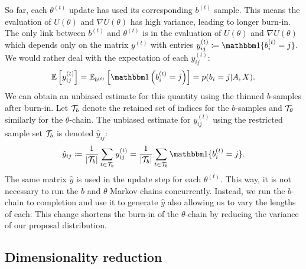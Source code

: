 So far, each $\theta^{(t)}$ update has used its corresponding $b^{(t)}$ sample. This means the evaluation of $U(\theta)$ and $\nabla U(\theta)$ has high variance, leading to longer burn-in. The only link between $b^{(t)}$ and $\theta^{(t)}$ is in the evaluation of $U(\theta)$ and $\nabla U(\theta)$ which depends only on the matrix $y^{(t)}$ with entries $y_{ij}^{(t)} \coloneqq \one\{b_i^{(t)} = j\}$. We would rather deal with the expectation of each $y_{ij}^{(t)}$:
%
\begin{equation}
	\Expect \left[ y_{ij}^{(t)} \right] = \Expect_{b^{(t)}} \left[ \one \left( b_{i}^{(t)} = j \right) \right]
	= p(b_i = j | A, X).
\end{equation}
%
We can obtain an unbiased estimate for this quantity using 
the thinned $b$-samples after burn-in.
Let $\mathcal{T}_b$  denote the retained set of indices 
for the $b$-samples and $\mathcal{T}_\theta$ similarly for the $\theta$-chain. 
The unbiased estimate for $y_{ij}^{(t)}$ using the 
restricted sample set $\mathcal{T}_b$ is denoted $\hat{y}_{ij}$:
%
\begin{equation}
	\hat{y}_{ij} \coloneqq \frac{1}{|\Tcal_b|} \sum_{t \in \Tcal_b} y_{ij}^{(t)} = \frac{1}{|\Tcal_b|} \sum_{t \in \Tcal_b} \one\{b_i^{(t)} = j\}.
	\label{eqn:y-hat}
\end{equation}
%
The same matrix $\hat{y}$ is used in the update step
for each $\theta^{(t)}$.
This way, it is not necessary to run the $b$ and $\theta$ Markov chains 
concurrently. Instead, we run the $b$-chain to completion and use it 
to generate $\hat{y}$ also allowing us to vary the lengths of each. This change shortens the burn-in of the $\theta$-chain by reducing the variance of our proposal distribution.

\subsection{Dimensionality reduction}
\label{sec:dim-reduction}

